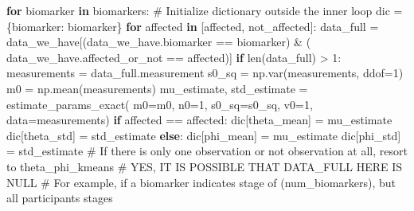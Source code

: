 \documentclass[
  letterpaper,
  DIV=11,
  numbers=noendperiod]{scrreprt}
\newenvironment{Shaded}{\begin{snugshade}}{\end{snugshade}}
\newcommand{\BuiltInTok}[1]{\textcolor[rgb]{0.00,0.23,0.31}{#1}}
\newcommand{\CommentTok}[1]{\textcolor[rgb]{0.37,0.37,0.37}{#1}}
\newcommand{\ControlFlowTok}[1]{\textcolor[rgb]{0.00,0.23,0.31}{\textbf{#1}}}
\newcommand{\DecValTok}[1]{\textcolor[rgb]{0.68,0.00,0.00}{#1}}
\newcommand{\KeywordTok}[1]{\textcolor[rgb]{0.00,0.23,0.31}{\textbf{#1}}}
\newcommand{\NormalTok}[1]{\textcolor[rgb]{0.00,0.23,0.31}{#1}}
\newcommand{\OperatorTok}[1]{\textcolor[rgb]{0.37,0.37,0.37}{#1}}
\newcommand{\StringTok}[1]{\textcolor[rgb]{0.13,0.47,0.30}{#1}}
\begin{document}
\begin{Shaded}
\begin{Highlighting}[]
    \ControlFlowTok{for}\NormalTok{ biomarker }\KeywordTok{in}\NormalTok{ biomarkers:}
        \CommentTok{\# Initialize dictionary outside the inner loop}
\NormalTok{        dic }\OperatorTok{=}\NormalTok{ \{}\StringTok{\textquotesingle{}biomarker\textquotesingle{}}\NormalTok{: biomarker\}}
        \ControlFlowTok{for}\NormalTok{ affected }\KeywordTok{in}\NormalTok{ [}\StringTok{\textquotesingle{}affected\textquotesingle{}}\NormalTok{, }\StringTok{\textquotesingle{}not\_affected\textquotesingle{}}\NormalTok{]:}
\NormalTok{            data\_full }\OperatorTok{=}\NormalTok{ data\_we\_have[(data\_we\_have.biomarker }\OperatorTok{==}\NormalTok{ biomarker) }\OperatorTok{\&}\NormalTok{ (}
\NormalTok{                data\_we\_have.affected\_or\_not }\OperatorTok{==}\NormalTok{ affected)]}
            \ControlFlowTok{if} \BuiltInTok{len}\NormalTok{(data\_full) }\OperatorTok{\textgreater{}} \DecValTok{1}\NormalTok{:}
\NormalTok{                measurements }\OperatorTok{=}\NormalTok{ data\_full.measurement}
\NormalTok{                s0\_sq }\OperatorTok{=}\NormalTok{ np.var(measurements, ddof}\OperatorTok{=}\DecValTok{1}\NormalTok{)}
\NormalTok{                m0 }\OperatorTok{=}\NormalTok{ np.mean(measurements)}
\NormalTok{                mu\_estimate, std\_estimate }\OperatorTok{=}\NormalTok{ estimate\_params\_exact(}
\NormalTok{                    m0}\OperatorTok{=}\NormalTok{m0, n0}\OperatorTok{=}\DecValTok{1}\NormalTok{, s0\_sq}\OperatorTok{=}\NormalTok{s0\_sq, v0}\OperatorTok{=}\DecValTok{1}\NormalTok{, data}\OperatorTok{=}\NormalTok{measurements)}
                \ControlFlowTok{if}\NormalTok{ affected }\OperatorTok{==} \StringTok{\textquotesingle{}affected\textquotesingle{}}\NormalTok{:}
\NormalTok{                    dic[}\StringTok{\textquotesingle{}theta\_mean\textquotesingle{}}\NormalTok{] }\OperatorTok{=}\NormalTok{ mu\_estimate}
\NormalTok{                    dic[}\StringTok{\textquotesingle{}theta\_std\textquotesingle{}}\NormalTok{] }\OperatorTok{=}\NormalTok{ std\_estimate}
                \ControlFlowTok{else}\NormalTok{:}
\NormalTok{                    dic[}\StringTok{\textquotesingle{}phi\_mean\textquotesingle{}}\NormalTok{] }\OperatorTok{=}\NormalTok{ mu\_estimate}
\NormalTok{                    dic[}\StringTok{\textquotesingle{}phi\_std\textquotesingle{}}\NormalTok{] }\OperatorTok{=}\NormalTok{ std\_estimate}
            \CommentTok{\# If there is only one observation or not observation at all, resort to theta\_phi\_kmeans}
            \CommentTok{\# YES, IT IS POSSIBLE THAT DATA\_FULL HERE IS NULL}
            \CommentTok{\# For example, if a biomarker indicates stage of (num\_biomarkers), but all participants\textquotesingle{} stages}

\end{Highlighting}
\end{Shaded}
\end{document}
